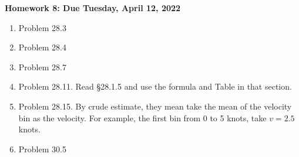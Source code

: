 \documentclass[11pt]{article}
\begin{document}
\newcommand{\problem}[1]{%
\item {#1}
}
\newcommand{\probl}[1]{\label{#1}}
\def\be{\begin{equation}}
\def\ee{\end{equation}}
\def\bea{\begin{eqnarray}}
\def\eea{\end{eqnarray}}
\newcommand{\vs}{\nonumber\\}
\def\across{a^\times}
\def\tcross{T^\times}
\def\ccross{C^\times}
\newcommand{\ec}[1]{Eq.~(\ref{eq:#1})}
\newcommand{\eec}[2]{Eqs.~(\ref{eq:#1}) and (\ref{eq:#2})}
\newcommand{\Ec}[1]{(\ref{eq:#1})}
\newcommand{\eql}[1]{\label{eq:#1}}
\newcommand{\sfig}[2]{
\texttt{[image: \#1]}
        }
\newcommand{\sfigr}[2]{
\texttt{[image: \#1]}
        }
\newcommand{\sfigra}[2]{
\texttt{[image: \#1]}
        }
\newcommand{\Sfig}[2]{
   \begin{figure}[thbp]
   \begin{center}
    \sfig{#1.pdf}{0.5\columnwidth}
    \caption{{\small #2}}
    \label{fig:#1}
     \end{center}
   \end{figure}
}

\newcommand\dirac{\delta_D}
\newcommand{\rf}[1]{\ref{fig:#1}}
\newcommand\rhoc{\rho_{\rm cr}}
\newcommand\zs{D_S}
\newcommand\dts{\Delta t_{\rm Sh}}
\newcommand\zle{D_L}
\newcommand\zsl{D_{SL}}
\newcommand\sh{\gamma}
\newcommand\surb{\mathcal{S}}
\newcommand\psf{\mathcal{P}}
\newcommand\spsf{\sigma_{\rm PSF}}
\newcommand\bei{\begin{itemize}}
\newcommand\eei{\end{itemize}}
\begin{centering}
{\bf Homework 8: Due Tuesday, April 12, 2022}
\end{centering}

\begin{enumerate}

\problem{Problem 28.3}
\problem{Problem 28.4}
\problem{Problem 28.7}
\problem{Problem 28.11. Read \S 28.1.5 and use the formula and Table in that section.}
\problem{Problem 28.15. By crude estimate, they mean take the mean of the velocity bin as the velocity. For example, the first bin from 0 to 5 knots, take $v=2.5$ knots.}
\problem{Problem 30.5}

\end{enumerate}
\end{document}
